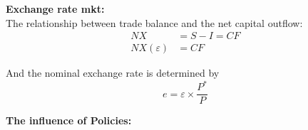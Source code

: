 \documentclass[12pt]{article}
\begin{document}
\begin{figure}[H]
\end{figure}




{\textbf {Exchange rate mkt:}}\\
The relationship between trade balance and the net capital outflow:
\begin{align*}
NX &= S - I = CF\\
NX(\varepsilon) &= CF
\end{align*}

\begin{figure}[H]
\end{figure}

And the nominal exchange rate is determined by
\begin{equation*}
e = \varepsilon  \times \frac{P^{*}}{P}
\end{equation*}








{\textbf {The influence of Policies:}}
\end{document}
